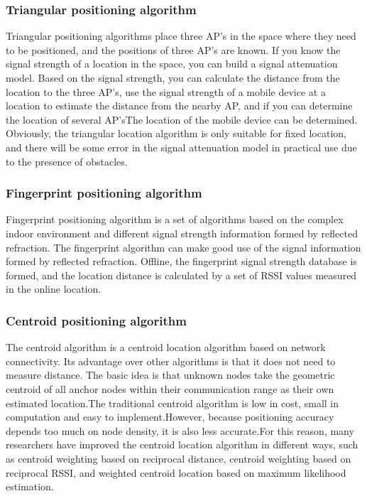 \documentclass[12pt]{report}
\begin{document}
\subsubsection{Triangular positioning algorithm}
Triangular positioning algorithms place three AP's in the space where they need to be positioned, and the positions of three AP's are known. If you know the signal strength of a location in the space, you can build a signal attenuation model. Based on the signal strength, you can calculate the distance from the location to the three AP's, use the signal strength of a mobile device at a location to estimate the distance from the nearby AP, and if you can determine the location of several AP'sThe location of the mobile device can be determined. Obviously, the triangular location algorithm is only suitable for fixed location, and there will be some error in the signal attenuation model in practical use due to the presence of obstacles.

\subsubsection{Fingerprint positioning algorithm}
Fingerprint positioning algorithm is a set of algorithms based on the complex indoor environment and different signal strength information formed by reflected refraction. The fingerprint algorithm can make good use of the signal information formed by reflected refraction. Offline, the fingerprint signal strength database is formed, and the location distance is calculated by a set of RSSI values measured in the online location.

\subsubsection{Centroid positioning algorithm}
The centroid algorithm is a centroid location algorithm based on network connectivity. Its advantage over other algorithms is that it does not need to measure distance. The basic idea is that unknown nodes take the geometric centroid of all anchor nodes within their communication range as their own estimated location.The traditional centroid algorithm is low in cost, small in computation and easy to implement.However, because positioning accuracy depends too much on node density, it is also less accurate.For this reason, many researchers have improved the centroid location algorithm in different ways, such as centroid weighting based on reciprocal distance, centroid weighting based on reciprocal RSSI, and weighted centroid location based on maximum likelihood estimation.
\end{document}
